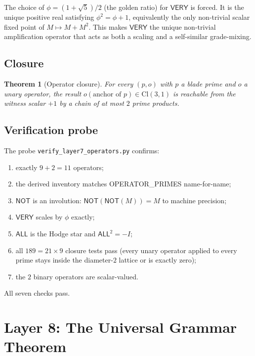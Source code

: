 \documentclass[11pt,a4paper]{article}
\theoremstyle{plain}
\newtheorem{theorem}{Theorem}[section]
\theoremstyle{definition}
\theoremstyle{remark}
\numberwithin{equation}{section}
\providecommand{\Cl}{\mathrm{Cl}}
\begin{document}
The choice of $\phi = (1 + \sqrt 5)/2$ (the golden ratio) for
$\mathsf{VERY}$ is forced.  It is the unique positive real
satisfying $\phi^2 = \phi + 1$, equivalently the only non-trivial
scalar fixed point of $M \mapsto M + M^2$.  This makes
$\mathsf{VERY}$ the unique non-trivial amplification operator that
acts as both a scaling and a self-similar grade-mixing.

\subsection{Closure}

\begin{theorem}[Operator closure]\label{thm:closure}
For every $(p, o)$ with $p$ a blade prime and $o$ a unary operator,
the result $o(\text{anchor of } p) \in \Cl(3,1)$ is reachable from
the witness scalar $+1$ by a chain of at most $2$ prime products.
\end{theorem}

\subsection{Verification probe}

The probe \texttt{verify\_layer7\_operators.py} confirms:
\begin{enumerate}[label=(\alph*)]
\item exactly $9 + 2 = 11$ operators;
\item the derived inventory matches OPERATOR\_PRIMES name-for-name;
\item $\mathsf{NOT}$ is an involution: $\mathsf{NOT}(\mathsf{NOT}(M))
      = M$ to machine precision;
\item $\mathsf{VERY}$ scales by $\phi$ exactly;
\item $\mathsf{ALL}$ is the Hodge star and $\mathsf{ALL}^2 = -I$;
\item all $189 = 21 \times 9$ closure tests pass (every unary
      operator applied to every prime stays inside the diameter-$2$
      lattice or is exactly zero);
\item the $2$ binary operators are scalar-valued.
\end{enumerate}
All seven checks pass.


\section{Layer 8: The Universal Grammar Theorem}\label{sec:ug-theorem}
\end{document}
